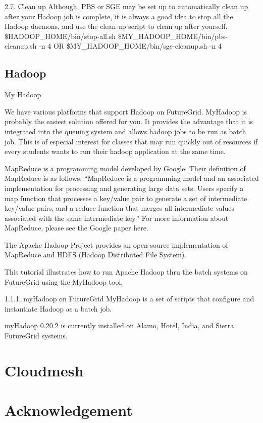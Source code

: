 \documentclass{article}
\begin{document}
2.7. Clean up
Although, PBS or SGE may be set up to automatically clean up after your Hadoop job is
complete, it is always a good idea to stop all the Hadoop daemons, and use the clean-up
script to clean up after yourself.
\$HADOOP\_HOME/bin/stop-all.sh
\$MY\_HADOOP\_HOME/bin/pbs-cleanup.sh -n 4 OR
\$MY\_HADOOP\_HOME/bin/sge-cleanup.sh -n 4


\subsection{Hadoop}

My Hadoop

We have various platforms that support Hadoop on FutureGrid. MyHadoop is probably the easiest solution offered for you. It provides the advantage that it is integrated into the queuing system and allows hadoop jobs to be run as batch job. This is of especial interest for classes that may run quickly out of resources if every students wants to run their hadoop application at the same time.



MapReduce is a programming model developed by Google. Their definition of MapReduce is as follows: “MapReduce is a programming model and an associated implementation for processing and generating large data sets. Users specify a map function that processes a key/value pair to generate a set of intermediate key/value pairs, and a reduce function that merges all intermediate values associated with the same intermediate key.” For more information about MapReduce, please see the Google paper here.

The Apache Hadoop Project provides an open source implementation of MapReduce and HDFS (Hadoop Distributed File System).

This tutorial illustrates how to run Apache Hadoop thru the batch systems on FutureGrid using the MyHadoop tool.

1.1.1. myHadoop on FutureGrid
MyHadoop is a set of scripts that configure and instantiate Hadoop as a batch job.

myHadoop 0.20.2 is currently installed on Alamo, Hotel, India, and Sierra FutureGrid systems.

\section{Cloudmesh}


\section*{Acknowledgement}
\end{document}

